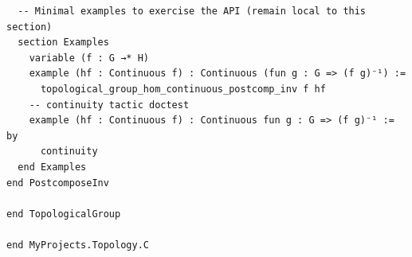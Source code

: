 \documentclass[12pt]{article}
\begin{document}
\begin{lstlisting}
  -- Minimal examples to exercise the API (remain local to this section)
  section Examples
    variable (f : G →* H)
    example (hf : Continuous f) : Continuous (fun g : G => (f g)⁻¹) :=
      topological_group_hom_continuous_postcomp_inv f hf
    -- continuity tactic doctest
    example (hf : Continuous f) : Continuous fun g : G => (f g)⁻¹ := by
      continuity
  end Examples
end PostcomposeInv

end TopologicalGroup

end MyProjects.Topology.C

\end{lstlisting}
\end{document}
